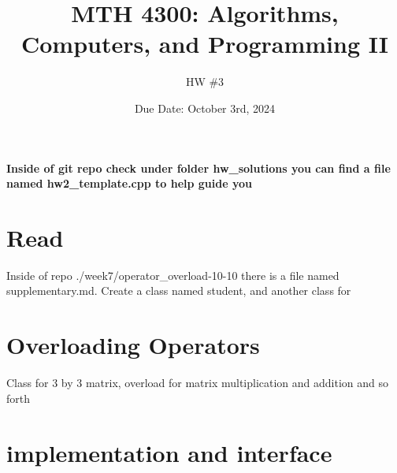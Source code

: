 \documentclass[a4paper]{article}
\title{MTH 4300: Algorithms, Computers, and Programming II}
\author{HW \#3}
\date{Due Date: October 3rd, 2024}
\begin{document}
\maketitle

\textbf{Inside of git repo check under folder hw\_solutions you can find a file named hw2\_template.cpp to help guide you}

\section{Read}
Inside of repo ./week7/operator_overload-10-10 there is a file named supplementary.md. Create 
a class named student, and another class for 


\section{Overloading Operators}
Class for 3 by 3 matrix, overload for matrix multiplication and addition and so forth


\section{implementation and interface}
\end{document}

